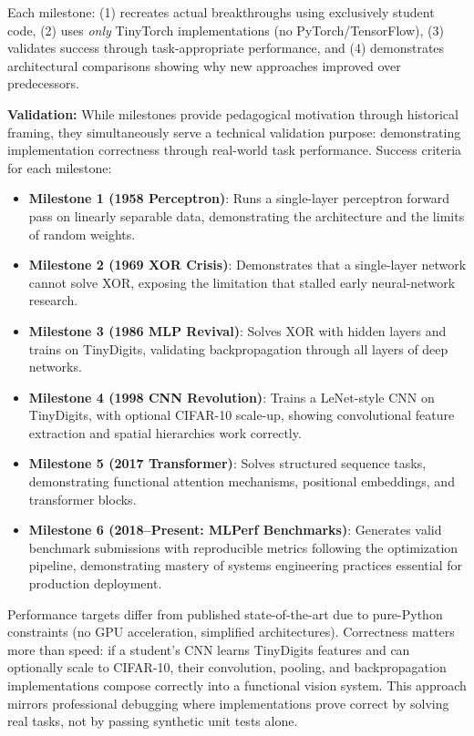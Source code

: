 \documentclass[10pt,twocolumn]{article}
\begin{document}
Each milestone: (1) recreates actual breakthroughs using exclusively student code, (2) uses \emph{only} TinyTorch implementations (no PyTorch/TensorFlow), (3) validates success through task-appropriate performance, and (4) demonstrates architectural comparisons showing why new approaches improved over predecessors.

\textbf{Validation:}
While milestones provide pedagogical motivation through historical framing, they simultaneously serve a technical validation purpose: demonstrating implementation correctness through real-world task performance. Success criteria for each milestone:

\begin{itemize}[leftmargin=*, itemsep=1pt, parsep=0pt]
    \item \textbf{Milestone 1 (1958 Perceptron)}: Runs a single-layer perceptron forward pass on linearly separable data, demonstrating the architecture and the limits of random weights.
    \item \textbf{Milestone 2 (1969 XOR Crisis)}: Demonstrates that a single-layer network cannot solve XOR, exposing the limitation that stalled early neural-network research.
    \item \textbf{Milestone 3 (1986 MLP Revival)}: Solves XOR with hidden layers and trains on TinyDigits, validating backpropagation through all layers of deep networks.
    \item \textbf{Milestone 4 (1998 CNN Revolution)}: Trains a LeNet-style CNN on TinyDigits, with optional CIFAR-10 scale-up, showing convolutional feature extraction and spatial hierarchies work correctly.
    \item \textbf{Milestone 5 (2017 Transformer)}: Solves structured sequence tasks, demonstrating functional attention mechanisms, positional embeddings, and transformer blocks.
    \item \textbf{Milestone 6 (2018--Present: MLPerf Benchmarks)}: Generates valid benchmark submissions with reproducible metrics following the optimization pipeline, demonstrating mastery of systems engineering practices essential for production deployment.
\end{itemize}

Performance targets differ from published state-of-the-art due to pure-Python constraints (no GPU acceleration, simplified architectures). Correctness matters more than speed: if a student's CNN learns TinyDigits features and can optionally scale to CIFAR-10, their convolution, pooling, and backpropagation implementations compose correctly into a functional vision system. This approach mirrors professional debugging where implementations prove correct by solving real tasks, not by passing synthetic unit tests alone.
\end{document}
